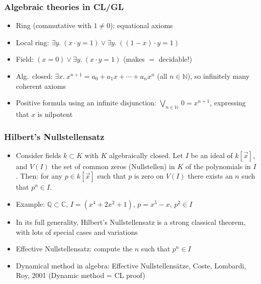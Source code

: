 \documentclass[handout,11pt]{beamer}
\newcommand{\nat}{\mathbb{N}}
\begin{document}
\begin{frame}
\frametitle{Algebraic theories in CL/GL}
 \begin{itemize}[<+->]   %
    \item Ring (commutative with $1\neq0$): equational axioms
    \item Local ring: $%
    \exists y.~(x\cdot y=1) \lor \exists y.~((1-x)\cdot y = 1)$
    \item Field: $%
    (x=0) \lor \exists y.~(x\cdot y=1)$ (makes $=$ decidable!)
    \item Alg.\ closed: $%
    \exists x.~x^{n+1}=a_0 + a_1 x + \cdots + a_n x^n $ (all $n\in\nat$),
    so infinitely many coherent axioms
    \item Positive formula using an infinite disjunction:
    $\bigvee_{n\in\nat}\, 0= x^{n+1}$, expressing that $x$ is nilpotent

 \end{itemize}
\end{frame}

\begin{frame}
\frametitle{Hilbert's Nullstellensatz}
 \begin{itemize}[<+->]   %
    \item Consider fields $k \subset K$ with $K$ algebraically closed.
    Let $I$ be an ideal of $k[\vec x]$, and $V(I)$ the set of common zeros (Nullstellen)
    in $K$ of the polynomials in $I$. Then: for any $p\in k[\vec x]$ such that
    $p$ is zero on $V(I)$ there exists an $n$ such that $p^n \in I$.
    \item Example: 
  $\mathbb{Q} \subset \mathbb{C}$, $I=(x^4+2x^2+1)$, $p= x^5-x$, $p^2 \in I$
    \item In its full generality, Hilbert's Nullstellensatz is a 
    strong classical theorem, with lots of special cases and variations
    \item Effective Nullstellensatz: \alert{compute} the $n$ such that $p^n \in I$
    \item Dynamical method in algebra: Effective Nullstellensätze,
    Coste, Lombardi, Roy, 2001 (Dynamic method = CL proof)

 \end{itemize}
\end{frame}
\end{document}
